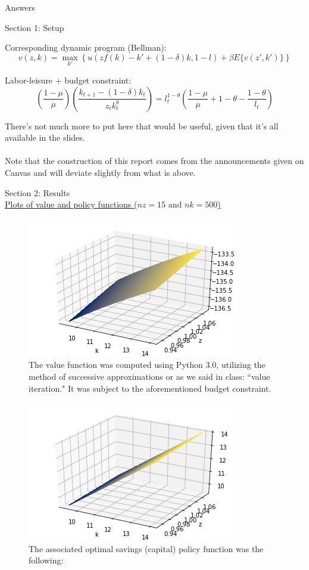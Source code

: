 \documentclass[12pt]{article}
\begin{document}
\begin{doublespace}
\newpage
\begin{center}
\LARGE{Answers}
\end{center}

\begin{center}
\large{Section 1: Setup}
\end{center}

Corresponding dynamic program (Bellman): 
\[
v(z,k) = \max_{k'} \left\{u(zf(k)-k'+(1-\delta)k,1-l) + \beta E\{v(z',k')\}\right\}
\]

Labor-leisure + budget constraint: 
\[
\left(\frac{1-\mu}{\mu}\right)\left(\frac{k_{t+1}-(1-\delta)k_t}{z_t k_t^\theta}\right) = l_t^{1-\theta}\left(\frac{1-\mu}{\mu}+1-\theta-\frac{1-\theta}{l_t}\right)
\]

There's not much more to put here that would be useful, given that it's all available in the slides. \\
\\
Note that the construction of this report comes from the announcements given on Canvas and will deviate slightly from what is above.

\newpage
\begin{center}
\large{Section 2: Results}\\
\normalsize\underline{Plots of value and policy functions ($nz = 15 \mbox{ and } nk = 500$)}
\end{center}

\begin{figure}[h]
\caption{The value function was computed using Python 3.0, utilizing the method of successive approximations or as we said in class: ``value iteration." It was subject to the aforementioned budget constraint.}
\includegraphics{3d_value_plot_nz15_nk500}
\end{figure}

\begin{figure}[h]
\caption{The associated optimal savings (capital) policy function was the following:}
\includegraphics{3d_capital_plot_nz15_nk500}
\end{figure}


\end{doublespace}
\end{document}
